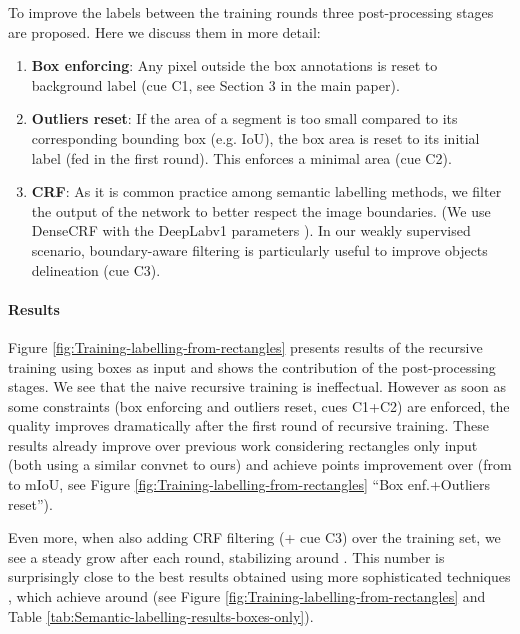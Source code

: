 \documentclass[10pt,english,british,twocolumn]{article}
\begin{document}
To improve the labels between the training rounds three post-processing
stages are proposed. Here we discuss them in more detail:
\begin{enumerate}
\item \textbf{Box enforcing}: Any pixel outside the box annotations is reset
to background label (cue C1, see Section 3 in the main paper).
\item \textbf{Outliers reset}: If the area of a segment is too small compared
to its corresponding bounding box (e.g. IoU), the box area
is reset to its initial label (fed in the first round). This enforces
a minimal area (cue C2).
\item \textbf{CRF}: As it is common practice among semantic labelling methods,
we filter the output of the network to better respect the image boundaries.
(We use DenseCRF \cite{Kraehenbuehl2011Nips} with the Deep\-Lab\-v1
parameters \cite{Chen2015Iclr}). In our weakly supervised scenario,
boundary-aware filtering is particularly useful to improve objects
delineation (cue C3).
\end{enumerate}
\vspace{-1em}


\paragraph{Results}

Figure \ref{fig:Training-labelling-from-rectangles} presents results
of the recursive training using boxes as input and shows the contribution
of the post-processing stages. We see that the naive recursive training
is ineffectual. However as soon as some constraints (box enforcing
and outliers reset, cues C1+C2) are enforced, the quality improves
dramatically after the first round of recursive training. These results
already improve over previous work considering rectangles only input
\cite{Dai2015Iccv,Papandreou2015Iccv} (both using a similar convnet
to ours) and achieve  points improvement over \cite{Papandreou2015Iccv}
(from  to  mIoU, see Figure \ref{fig:Training-labelling-from-rectangles}
``Box enf.+Outliers reset'').

Even more, when also adding CRF filtering (+ cue C3) over the training
set, we see a steady grow after each round, stabilizing around .
This number is surprisingly close to the best results obtained using
more sophisticated techniques \cite{Dai2015Iccv}, which achieve around
 (see Figure \ref{fig:Training-labelling-from-rectangles}
and Table \ref{tab:Semantic-labelling-results-boxes-only}). 
\end{document}
